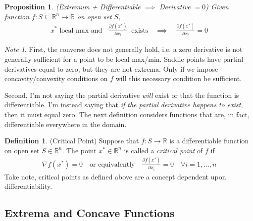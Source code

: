 \documentclass[12pt]{article}
\numberwithin{equation}{section} %
\theoremstyle{plain}
\newtheorem{prop}[thm]{Proposition}
\theoremstyle{definition}
\newtheorem{defn}[thm]{Definition}
\theoremstyle{remark}
\newtheorem*{note}{Note}
\newcommand{\R}{\mathbb{R}}
\newcommand{\Rn}{\mathbb{R}^n}
\begin{document}
\begin{prop}
\emph{(Extremum + Differentiable $\implies$ Derivative $=0$)}
Given function $f:S\subseteq \Rn\rightarrow \R$ on open set $S$,
\begin{align*}
  \text{$x^*$ local max and }\;\;
  \frac{\partial f(x^*)}{\partial x_i}
  \;\;\text{exists}
  \quad\implies\quad
  \frac{\partial f(x^*)}{\partial x_i} =0
\end{align*}
\end{prop}

\begin{note}
First, the converse does not generally hold, i.e. a zero derivative is
not generally sufficient for a point to be local max/min. Saddle points
have partial derivatives equal to zero, but  they are not extrema.
Only if we impose concavity/convexity conditions on $f$ will this
necessary condition be sufficient.

Second, I'm not saying the partial derivative \emph{will} exist or that
the function is differentiable. I'm instead saying that
\emph{if the partial derivative happens to exist}, then it must equal
zero.
The next definition considers functions that are, in
fact, differentiable everywhere in the domain.
\end{note}

\begin{defn}{(Critical Point)}
Suppose that $f:S\rightarrow\R$ is a differentiable function on open set
$S\in\Rn$. The point $x^*\in\Rn$ is called a \emph{critical
point} of $f$ if
\begin{align*}
  \nabla f(x^*) = 0
  \quad\text{or equivalently}\quad
  \frac{\partial f(x^*)}{\partial x_i} =0
  \quad\forall i=1,\ldots,n
\end{align*}
Take note, critical points as defined above are a concept dependent upon
differentiability.
\end{defn}

\subsection{Extrema and Concave Functions}
\label{sec:extrema-concave}
\end{document}
